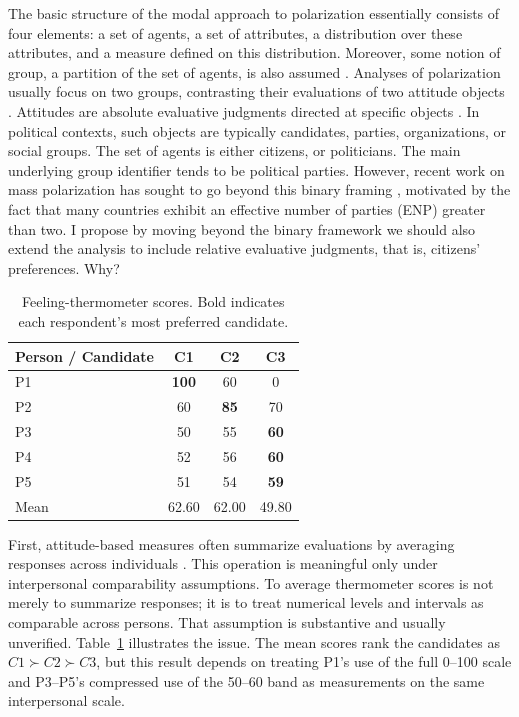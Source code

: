 \documentclass[12pt]{article}
\begin{document}
The basic structure of the modal approach to polarization essentially consists of four elements: a set of agents, a set of attributes, a distribution over these attributes, and a measure defined on this distribution. Moreover, some notion of group, a partition of the set of agents,  is also assumed \parencite{bramson16_disam_social_polar_concep_measur, esteban1994measurement}.  Analyses of polarization usually focus on two groups, contrasting their evaluations of two attitude objects \parencite{fiorina08_polit_polar_americ_public, mason2015disrespectfully, iyengar12_affec_not_ideol}. Attitudes are absolute evaluative judgments directed at specific objects \parencite{holbrook2011attitude}. In political contexts, such objects are typically candidates, parties, organizations, or social groups. The set of agents is either citizens, or politicians. The main underlying group identifier tends to be political parties. However, recent work on mass polarization has sought to go beyond this binary framing  \parencite{kekkonen21_affec_blocs, rothers25_poles_polar, mehlhaff23_group_based_approac_to_measur_polar}, motivated by the fact that many countries exhibit an effective number of parties (ENP) greater than two. I propose by moving beyond the binary framework we should also extend the analysis to include relative evaluative judgments, that is, citizens' preferences. Why?



\begin{table}[h!]
  \centering
\begin{tabular}{lccc}
\toprule
\textbf{Person / Candidate} &  \textbf{C1} & \textbf{C2} & \textbf{C3} \\
\midrule
P1 & \textbf{100} & 60 & 0 \\
P2 & 60 & \textbf{85} & 70 \\
P3 & 50 & 55 & \textbf{60} \\
P4 & 52 & 56 & \textbf{60} \\
P5 & 51 & 54 & \textbf{59} \\
\midrule
Mean & 62.60 & 62.00 & 49.80 \\
\bottomrule
\end{tabular}
\caption{Feeling-thermometer scores. Bold indicates each respondent's most preferred candidate.}
\label{tab:mean}
\end{table}

First, attitude-based measures often summarize evaluations by averaging responses across individuals \parencite{fuks22_polar_e_contex, borba24_polar_ideol, mehlhaff23_group_based_approac_to_measur_polar}. This operation is meaningful only under interpersonal comparability assumptions. To average thermometer scores is not merely to summarize responses; it is to treat numerical levels and intervals as comparable across persons. That assumption is substantive and usually unverified. Table~\ref{tab:mean} illustrates the issue. The mean scores rank the candidates as \(C1 \succ C2 \succ C3\), but this result depends on treating P1's use of the full 0--100 scale and P3--P5's compressed use of the 50--60 band as measurements on the same interpersonal scale.
\end{document}
